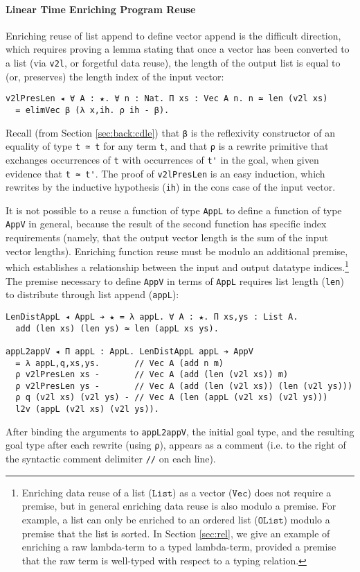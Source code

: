 \documentclass[acmsmall]{acmart}\settopmatter{}
\newcommand{\refsec}[1]{Section \ref{sec:#1}}
\newcommand{\txt}[1]{\ensuremath{\texttt{#1}}}
\begin{document}
\paragraph{Linear Time Enriching Program Reuse}

Enriching reuse of list append to define vector append is the
difficult direction, which requires proving a lemma stating
that once a vector has been converted to a list
(via \verb;v2l;, or forgetful data reuse), the length of the output
list is equal to (or, preserves) the length index of the input vector:

\begin{verbatim}
v2lPresLen ◂ ∀ A : ★. ∀ n : Nat. Π xs : Vec A n. n ≃ len (v2l xs) 
  = elimVec β (λ x,ih. ρ ih - β).
\end{verbatim}
Recall (from \refsec{back:cdle}) that \verb;β; is the reflexivity constructor
of an equality of type \verb;t ≃ t; for any term \verb;t;,
and that \verb;ρ; is a rewrite primitive that exchanges
occurrences of \verb;t; with occurrences of \verb;t'; in the goal,
when given evidence that \verb;t ≃ t';. The proof of \verb;v2lPresLen;
is an easy induction, which rewrites by the inductive hypothesis
(\verb;ih;) in the cons case of the input vector.

It is not possible to a reuse a function of type \verb;AppL; to define
a function of type \verb;AppV; in general, because the result of the second function
has specific index requirements (namely, that the output vector
length is the sum of the input vector lengths). Enriching
function reuse must be modulo an additional premise, which establishes
a relationship between the input and output datatype
indices.\footnote{
  Enriching data reuse of a list (\txt{List}) as a vector (\txt{Vec})
  does not require a premise, but in general enriching data reuse is
  also modulo a premise. For example, a list can only be enriched to
  an ordered list (\txt{OList}) modulo a premise that the list is
  sorted. In \refsec{rel}, we give an example of enriching a raw
  lambda-term to a typed lambda-term, provided a premise that the raw
  term is well-typed with respect to a typing relation.
  }
The premise necessary to define \verb;AppV; in terms of \verb;AppL; requires
list length (\verb;len;) to distribute through list append (\verb;appL;):

\begin{verbatim}
LenDistAppL ◂ AppL ➔ ★ = λ appL. ∀ A : ★. Π xs,ys : List A.
  add (len xs) (len ys) ≃ len (appL xs ys).

appL2appV ◂ Π appL : AppL. LenDistAppL appL ➔ AppV
  = λ appL,q,xs,ys.       // Vec A (add n m)            
  ρ v2lPresLen xs -       // Vec A (add (len (v2l xs)) m)
  ρ v2lPresLen ys -       // Vec A (add (len (v2l xs)) (len (v2l ys)))
  ρ q (v2l xs) (v2l ys) - // Vec A (len (appL (v2l xs) (v2l ys)))
  l2v (appL (v2l xs) (v2l ys)).
\end{verbatim}
After binding the arguments to \verb;appL2appV;,
the initial goal type, and the resulting goal type after each
rewrite (using \verb;ρ;), appears as a comment
(i.e. to the right of the syntactic comment delimiter \verb;//; on each line).
\end{document}
